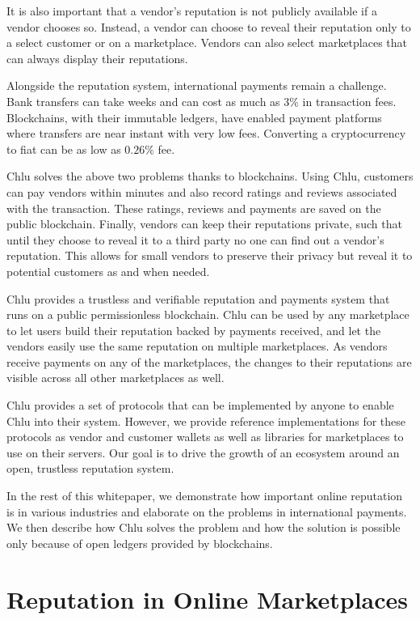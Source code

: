 \documentclass[a4paper]{article}
\begin{document}
It is also important that a vendor's reputation is not publicly
available if a vendor chooses so. Instead, a vendor can choose to
reveal their reputation only to a select customer or on a
marketplace. Vendors can also select marketplaces that can always
display their reputations.

Alongside the reputation system, international payments remain a
challenge. Bank transfers can take weeks and can cost as much as $3\%$
in transaction fees. Blockchains, with their immutable ledgers, have
enabled payment platforms where transfers are near instant with very
low fees. Converting a cryptocurrency to fiat can be as low as $0.26\%$
fee.

Chlu solves the above two problems thanks to blockchains. Using Chlu,
customers can pay vendors within minutes and also record ratings and
reviews associated with the transaction. These ratings, reviews and
payments are saved on the public blockchain. Finally, vendors can keep
their reputations private, such that until they choose to reveal it to
a third party no one can find out a vendor's reputation. This allows
for small vendors to preserve their privacy but reveal it to potential
customers as and when needed.

Chlu provides a trustless and verifiable reputation and payments
system that runs on a public permissionless blockchain. Chlu can be
used by any marketplace to let users build their reputation backed by
payments received, and let the vendors easily use the same reputation
on multiple marketplaces. As vendors receive payments on any of the
marketplaces, the changes to their reputations are visible across all
other marketplaces as well.

Chlu provides a set of protocols that can be implemented by anyone to
enable Chlu into their system. However, we provide reference
implementations for these protocols as vendor and customer wallets as
well as libraries for marketplaces to use on their servers. Our goal
is to drive the growth of an ecosystem around an open, trustless
reputation system.

In the rest of this whitepaper, we demonstrate how important online
reputation is in various industries and elaborate on the problems in
international payments. We then describe how Chlu solves the problem
and how the solution is possible only because of open ledgers provided
by blockchains.

\section{Reputation in Online Marketplaces}
\end{document}
